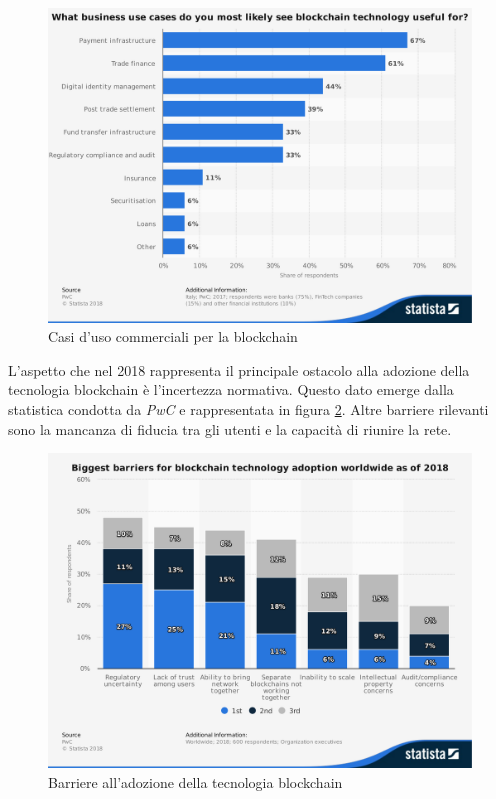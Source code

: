 \begin{figure}[H]
	\centering
	\includegraphics[width=.6\linewidth]{images/chap_intro/use-cases-among-businesses.pdf}
	\caption{Casi d'uso commerciali per la blockchain
		\cite{use-cases-among-businesses}}
	\label{fig:use-cases-among-businesses}
\end{figure}


L'aspetto che nel 2018 rappresenta il principale ostacolo alla adozione della tecnologia blockchain
è l'incertezza normativa. Questo dato emerge dalla statistica condotta da
\textit{PwC} \cite{barriers-worldwide}
e rappresentata in figura \ref{fig:barriers-worldwide}.
Altre barriere rilevanti sono la mancanza di fiducia tra gli utenti e la capacità di riunire la rete.


\begin{figure}[H]
	\centering
	\includegraphics[width=.6\linewidth]{images/chap_intro/barriers-worldwide.pdf}
	\caption{Barriere all'adozione della tecnologia blockchain
		\cite{barriers-worldwide}}
	\label{fig:barriers-worldwide}
\end{figure}